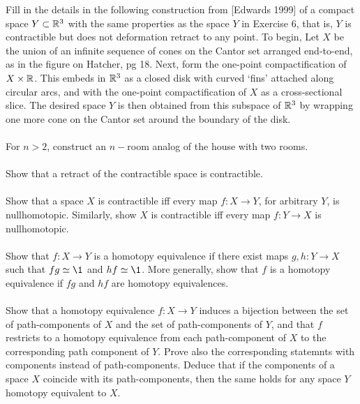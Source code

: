  Fill in the details in the following construction from [Edwards 1999] of a compact space $Y\subset \mathbb{R}^3$ with the same properties as the space $Y$ in Exercise 6, that is, $Y$ is contractible but does not deformation retract to any point. To begin, Let $X$ be the union of an infinite sequence of cones on the Cantor set arranged end-to-end, as in the figure on Hatcher, pg 18. Next, form the one-point compactification of $X\times\mathbb{R}$. This embeds in $\mathbb{R}^3$ as a closed disk with curved `fins' attached along circular arcs, and with the one-point compactification of $X$ as a cross-sectional slice. The desired space $Y$ is then obtained from this subspace of $\mathbb{R}^3$ by wrapping one more cone on the Cantor set around the boundary of the disk.
\\
\\
 For $n>2$, construct an $n-$room analog of the house with two rooms.
\\
\\
 Show that a retract of the contractible space is contractible.
\\
\\
 Show that a space $X$ is contractible iff every map $f\colon X\to Y$, for arbitrary $Y$, is nullhomotopic. Similarly, show $X$ is contractible iff every map $f\colon Y\to X$ is nullhomotopic.
\\
\\
 Show that $f\colon  X\to Y$ is a homotopy equivalence if there exist maps $g,h\colon Y\to X$ such that $fg\simeq\1$ and $hf\simeq\1$. More generally, show that $f$ is a homotopy equivalence if $fg$ and $hf$ are homotopy equivalences.
\\
\\
 Show that a homotopy equivalence $f\colon X\to Y$ induces a bijection between the set of path-components of $X$ and the set of path-components of $Y$, and that $f$ restricts to a  homotopy equivalence from each path-component of $X$ to the corresponding path component of $Y$. Prove also the corresponding statemnts with components instead of path-components. Deduce that if the components of a space $X$ coincide with its path-components, then the same holds for any space $Y$ homotopy equivalent to $X$.
